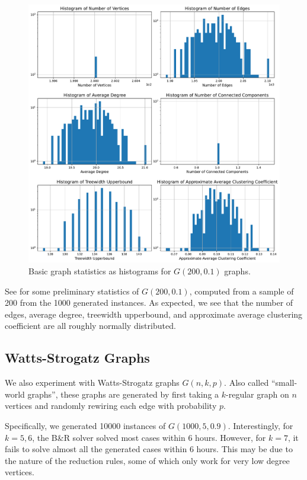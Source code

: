 \documentclass{article}
\begin{document}
\begin{figure}
     \centering
     \includegraphics[width=\textwidth]{figures/erdos_reyni_small}
     \caption{Basic graph statistics as histograms for $G(200, 0.1)$ graphs.}
     \label{fig:erdos_reyni_small}
\end{figure}

See  for some preliminary statistics of $G(200, 0.1)$,
computed from a sample of 200 from the 1000 generated instances.
As expected,
we see that the number of edges,
average degree,
treewidth upperbound,
and approximate average clustering coefficient
are all roughly normally distributed.

\subsection{Watts-Strogatz Graphs}
We also experiment with Watts-Strogatz graphs $G(n, k, p)$.
Also called ``small-world graphs'',
these graphs are generated by first taking a $k$-regular graph on $n$ vertices
and randomly rewiring each edge with probability $p$.

Specifically,
we generated 10000 instances of $G(1000, 5, 0.9)$.
Interestingly, for $k=5,6$,
the B\&R solver solved most cases within 6 hours.
However, for $k=7$, it fails to solve almost all the generated cases within 6 hours.
This may be due to the nature of the reduction rules,
some of which only work for very low degree vertices.
\end{document}
